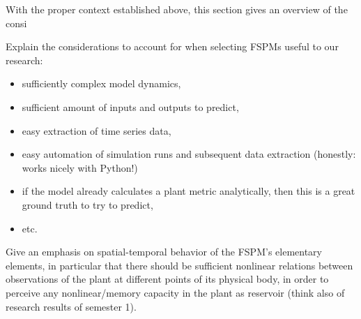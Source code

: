 With the proper context established above, this section gives an overview of the consi


Explain the considerations to account for when selecting FSPMs useful to our research:

\begin{itemize}
\item sufficiently complex model dynamics, 
\item sufficient amount of inputs and outputs to predict, 
\item easy extraction of time series data, 
\item easy automation of simulation runs and subsequent data extraction (honestly: works nicely with Python!)
\item if the model already calculates a plant metric analytically, then this is a great ground truth to try to predict, 
\item etc.
\end{itemize}

Give an emphasis on spatial-temporal behavior of the FSPM's elementary elements, in particular that there should be sufficient nonlinear relations between observations of the plant at different points of its physical body, in order to perceive any nonlinear/memory capacity in the plant as reservoir (think also of research results of semester 1).


%
%
%
